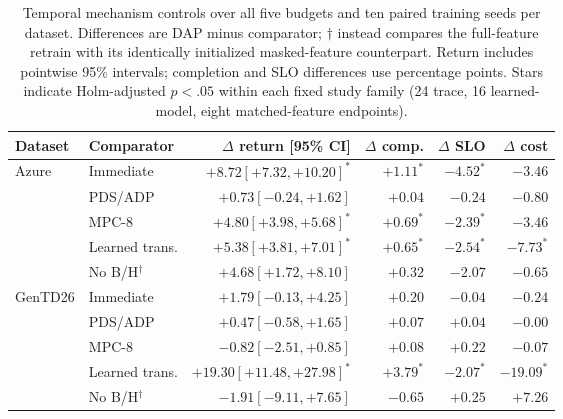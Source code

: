 \begin{table}[t]
\caption{Temporal mechanism controls over all five budgets and ten paired training seeds per dataset. Differences are DAP minus comparator; $\dagger$ instead compares the full-feature retrain with its identically initialized masked-feature counterpart. Return includes pointwise 95\% intervals; completion and SLO differences use percentage points. Stars indicate Holm-adjusted $p<.05$ within each fixed study family (24 trace, 16 learned-model, eight matched-feature endpoints).}
\label{tab:revision-trace}
\small
\begin{tabular}{llrrrr}
\toprule
Dataset & Comparator & $\Delta$ return [95\% CI] & $\Delta$ comp. & $\Delta$ SLO & $\Delta$ cost\\
\midrule
Azure & Immediate & $+8.72 [+7.32, +10.20]^{*}$ & $+1.11^{*}$ & $-4.52^{*}$ & $-3.46$\\
 & PDS/ADP & $+0.73 [-0.24, +1.62]$ & $+0.04$ & $-0.24$ & $-0.80$\\
 & MPC-8 & $+4.80 [+3.98, +5.68]^{*}$ & $+0.69^{*}$ & $-2.39^{*}$ & $-3.46$\\
 & Learned trans. & $+5.38 [+3.81, +7.01]^{*}$ & $+0.65^{*}$ & $-2.54^{*}$ & $-7.73^{*}$\\
 & No B/H$^\dagger$ & $+4.68 [+1.72, +8.10]$ & $+0.32$ & $-2.07$ & $-0.65$\\
\midrule
GenTD26 & Immediate & $+1.79 [-0.13, +4.25]$ & $+0.20$ & $-0.04$ & $-0.24$\\
 & PDS/ADP & $+0.47 [-0.58, +1.65]$ & $+0.07$ & $+0.04$ & $-0.00$\\
 & MPC-8 & $-0.82 [-2.51, +0.85]$ & $+0.08$ & $+0.22$ & $-0.07$\\
 & Learned trans. & $+19.30 [+11.48, +27.98]^{*}$ & $+3.79^{*}$ & $-2.07^{*}$ & $-19.09^{*}$\\
 & No B/H$^\dagger$ & $-1.91 [-9.11, +7.65]$ & $-0.65$ & $+0.25$ & $+7.26$\\
\bottomrule
\end{tabular}
\end{table}
